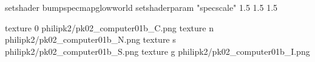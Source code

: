setshader bumpspecmapglowworld
setshaderparam "specscale" 1.5 1.5 1.5


texture 0 philipk2/pk02_computer01b_C.png
texture n philipk2/pk02_computer01b_N.png
texture s philipk2/pk02_computer01b_S.png
texture g philipk2/pk02_computer01b_I.png

